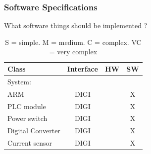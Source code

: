 	\subsubsection{Software Specifications}
	What software things should be implemented ?
	\\
	\begin{table}[h!]
			\begin{tabular}{| l | c | c | c |}
				\hline
	Class			& Interface	& HW	& SW	\\ \hline
	System:	&&&									\\ \hline
	ARM					& DIGI		&		& X 	\\ \hline
	PLC module			& DIGI		&		& X 	\\ \hline
	Power switch		& DIGI		&		& X 	\\ \hline
	Digital Converter	& DIGI		&		& X 	\\ \hline
	Current sensor		& DIGI		&		& X 	\\ \hline

				\end{tabular}
				\caption{S = simple. M = medium. C = complex. VC = very complex}
			\end{table}

